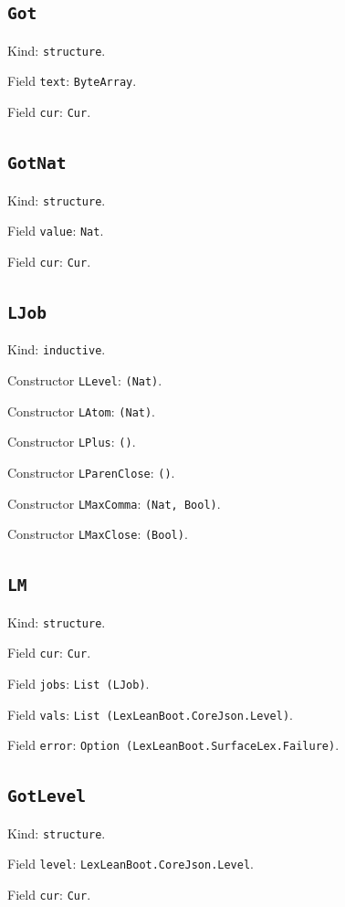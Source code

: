 \documentclass[11pt]{article}
\begin{document}
\subsection*{\texttt{Got}}
\noindent Kind: \texttt{structure}.\par
\noindent Field \texttt{text}: \texttt{ByteArray}.\par
\noindent Field \texttt{cur}: \texttt{Cur}.\par
\subsection*{\texttt{GotNat}}
\noindent Kind: \texttt{structure}.\par
\noindent Field \texttt{value}: \texttt{Nat}.\par
\noindent Field \texttt{cur}: \texttt{Cur}.\par
\subsection*{\texttt{LJob}}
\noindent Kind: \texttt{inductive}.\par
\noindent Constructor \texttt{LLevel}: \texttt{(Nat)}.\par
\noindent Constructor \texttt{LAtom}: \texttt{(Nat)}.\par
\noindent Constructor \texttt{LPlus}: \texttt{()}.\par
\noindent Constructor \texttt{LParenClose}: \texttt{()}.\par
\noindent Constructor \texttt{LMaxComma}: \texttt{(Nat, Bool)}.\par
\noindent Constructor \texttt{LMaxClose}: \texttt{(Bool)}.\par
\subsection*{\texttt{LM}}
\noindent Kind: \texttt{structure}.\par
\noindent Field \texttt{cur}: \texttt{Cur}.\par
\noindent Field \texttt{jobs}: \texttt{List (LJob)}.\par
\noindent Field \texttt{vals}: \texttt{List (LexLeanBoot.CoreJson.Level)}.\par
\noindent Field \texttt{error}: \texttt{Option (LexLeanBoot.SurfaceLex.Failure)}.\par
\subsection*{\texttt{GotLevel}}
\noindent Kind: \texttt{structure}.\par
\noindent Field \texttt{level}: \texttt{LexLeanBoot.CoreJson.Level}.\par
\noindent Field \texttt{cur}: \texttt{Cur}.\par
\end{document}
